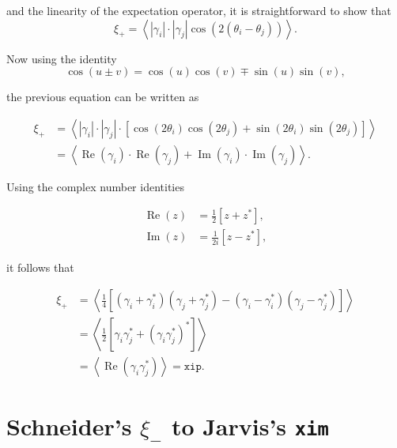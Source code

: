 \documentclass[%
 reprint,
 amsmath,amssymb,
 aps,
]{revtex4-1}
\begin{document}
and the linearity of the expectation operator, it is straightforward to show that
$$\xi_+=\left<|\gamma_i|\cdot|\gamma_j|\cos\left(2(\theta_i-\theta_j)\right)\right>.$$

Now using the identity
\begin{equation}\label{trig2}
\cos(u\pm v)=\cos\left(u\right)\cos\left(v\right)\mp\sin\left(u\right)\sin\left(v\right),
\end{equation}

the previous equation can be written as

\begin{align*}
\xi_+&=\left<|\gamma_i|\cdot|\gamma_j|\cdot\left[\cos\left(2\theta_i\right)\cos\left(2\theta_j\right)+\sin\left(2\theta_i\right)\sin\left(2\theta_j\right)\right]\right>\\
&=\left<\operatorname{Re}(\gamma_i)\cdot\operatorname{Re}(\gamma_j)+\operatorname{Im}(\gamma_i)\cdot\operatorname{Im}(\gamma_j)\right>.
\end{align*}

Using the complex number identities

\begin{align}
\operatorname{Re}(z)&=\frac{1}{2}\left[z+z^*\right],\label{complex1}\\
\operatorname{Im}(z)&=\frac{1}{2i}\left[z-z^*\right]\label{complex2},
\end{align}

it follows that

\begin{align*}
\xi_+&=\left<\frac{1}{4}\left[(\gamma_i+\gamma_i^*)(\gamma_j+\gamma_j^*)-(\gamma_i-\gamma_i^*)(\gamma_j-\gamma_j^*)\right]\right>\\
&=\left<\frac{1}{2}\left[\gamma_i\gamma_j^*+(\gamma_i\gamma_j^*)^*\right]\right>\\
&=\left<\operatorname{Re}(\gamma_i\gamma_j^*)\right>=\texttt{xip}.
\end{align*}

\section*{Schneider's $\xi_-$ to Jarvis's \texttt{xim}}
\end{document}
